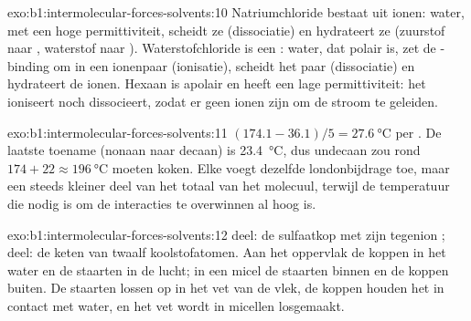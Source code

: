 \begin{solution}{exo:b1:intermolecular-forces-solvents:10}
Natriumchloride bestaat uit ionen: water, met een hoge permittiviteit,
scheidt ze (dissociatie) en hydrateert ze (zuurstof naar ,
waterstof naar ). Waterstofchloride is een :
water, dat polair is, zet de -binding om in een ionenpaar
 (ionisatie), scheidt het paar (dissociatie) en hydrateert de
ionen. Hexaan is apolair en heeft een lage permittiviteit: het ioniseert
noch dissocieert, zodat er geen ionen zijn om de stroom te geleiden.
\end{solution}

\begin{solution}{exo:b1:intermolecular-forces-solvents:11}
$(174.1 - 36.1)/5 = \qty{27.6}{\celsius}$ per . De laatste
toename (nonaan naar decaan) is \qty{23.4}{\celsius}, dus undecaan zou
rond $174 + 22 \approx \qty{196}{\celsius}$ moeten koken. Elke 
voegt dezelfde londonbijdrage toe, maar een steeds kleiner deel van het
totaal van het molecuul, terwijl de temperatuur die nodig is om de
interacties te overwinnen al hoog is.
\end{solution}

\begin{solution}{exo:b1:intermolecular-forces-solvents:12}
 deel: de sulfaatkop  met zijn tegenion ;
 deel: de keten van twaalf koolstofatomen. Aan het oppervlak de
koppen in het water en de staarten in de lucht; in een micel de staarten
binnen en de koppen buiten. De staarten lossen op in het vet van de
vlek, de koppen houden het in contact met water, en het vet wordt in
micellen losgemaakt.
\end{solution}

